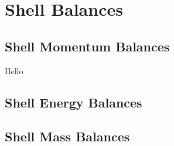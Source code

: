 \chapter{Shell Balances}

\section{Shell Momentum Balances}

Hello

\section{Shell Energy Balances}



\section{Shell Mass Balances}
